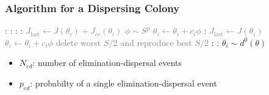 \documentclass{beamer}
\begin{document}
\begin{frame}
\frametitle{Algorithm for a Dispersing Colony}
\begin{algorithmic}[1]
:
  :
    \For {\textcolor{gray}{$j \gets 1 \dots N_c $}}:
      \For {\textcolor{gray}{$i \gets 1 \dots S$}}:
        \State \textcolor{gray}{$J_\text{last} \gets J(\theta_i) + J_{cc}(\theta_i)$}
        \State \textcolor{gray}{$\phi \sim S^p$}
        \State \textcolor{gray}{$\theta_i \gets \theta_i + c_i \phi$}
        :
          \State \textcolor{gray}{$J_\text{last} \gets J(\theta_i)$}
          \State \textcolor{gray}{$\theta_i \gets \theta_i + c_i \phi$}
        \EndWhile
      \EndFor
    \EndFor
    \State \textcolor{gray}{delete worst $S/2$ and reproduce best $S/2$}
  \EndFor
  :
    :
      \State $\theta_i \sim d^0(\theta)$
    \EndIf
  \EndFor
\EndFor
\end{algorithmic}
\begin{itemize}
  \item $N_{ed}$: number of elimination-dispersal events
  \item $p_{ed}$: probabilty of a single elimination-dispersal event
\end{itemize}
\end{frame}
\end{document}
